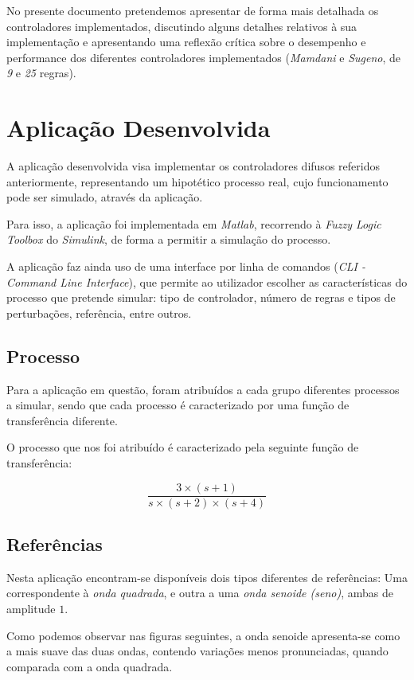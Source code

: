 \documentclass{article}
\begin{document}
No presente documento pretendemos apresentar de forma mais detalhada os controladores implementados, discutindo alguns detalhes relativos à sua implementação e apresentando uma reflexão crítica sobre o desempenho e performance dos diferentes controladores implementados (\emph{Mamdani} e \emph{Sugeno}, de \emph{9} e \emph{25} regras).


\pagebreak

\section{Aplicação Desenvolvida}

A aplicação desenvolvida visa implementar os controladores difusos referidos anteriormente, representando um hipotético processo real, cujo funcionamento pode ser simulado, através da aplicação.

Para isso, a aplicação foi implementada em \emph{Matlab}, recorrendo à \emph{Fuzzy Logic Toolbox} do \emph{Simulink}, de forma a permitir a simulação do processo.

A aplicação faz ainda uso de uma interface por linha de comandos (\emph{CLI - Command Line Interface}), que permite ao utilizador escolher as características do processo que pretende simular: tipo de controlador, número de regras e tipos de perturbações, referência, entre outros.

\subsection{Processo}

Para a aplicação em questão, foram atribuídos a cada grupo diferentes processos a simular, sendo que cada processo é caracterizado por uma função de transferência diferente.

O processo que nos foi atribuído é caracterizado pela seguinte função de transferência:

$$\frac{3\times (s + 1)}{s\times (s + 2)\times (s + 4)}$$


\subsection{Referências}

Nesta aplicação encontram-se disponíveis dois tipos diferentes de referências: Uma correspondente à \emph{onda quadrada}, e outra a uma \emph{onda senoide (seno)}, ambas de amplitude $1$.

Como podemos observar nas figuras seguintes, a onda senoide apresenta-se como a mais suave das duas ondas, contendo variações menos pronunciadas, quando comparada com a onda quadrada.
\end{document}
